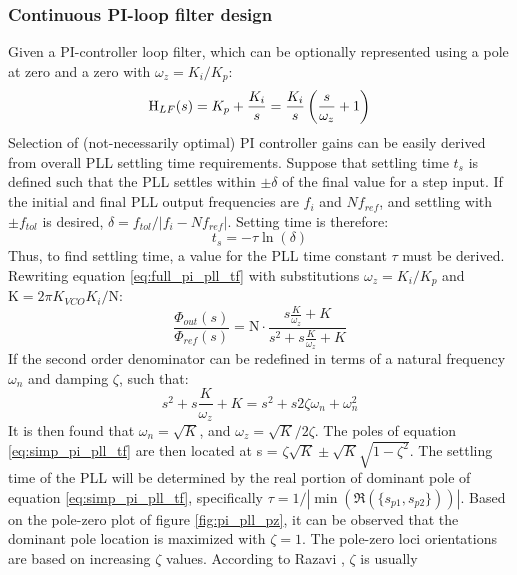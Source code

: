 		\subsubsection{Continuous PI-loop filter design}
			Given a PI-controller loop filter, which can be optionally represented using a pole at zero and a zero with $\omega_z = K_i/K_p$:
			\begin{equation} \label{eq:pi_pll_tf}
				\textnormal{H}_{LF}(s) = K_p + \frac{K_i}{s}  = \frac{K_i}{s}\left(\frac{s}{\omega_z} + 1\right) 
			\end{equation}
			Selection of (not-necessarily optimal) PI controller gains can be easily derived from overall PLL settling time requirements. Suppose that settling time $t_s$ is defined such that the PLL settles within $\pm \delta$ of the final value for a step input. If the initial and final PLL output frequencies are $f_i$ and $Nf_{ref}$, and settling with $\pm f_{tol}$ is desired,  $\delta = f_{tol}/|f_i - Nf_{ref}|$. Setting time is therefore:
			\begin{equation}
				t_s = -\tau\ln(\delta)
			\end{equation}
			Thus, to find settling time, a value for the PLL time constant $\tau$ must be derived. Rewriting equation \ref{eq:full_pi_pll_tf} with substitutions $\omega_z = K_i/K_p$ and $\mathrm{K} = 2\pi K_{VCO}K_i/\mathrm{N}$:
			\begin{equation} \label{eq:simp_pi_pll_tf}
				\frac{\Phi_{out}(s)}{\Phi_{ref}(s)} = \mathrm{N}\cdot\frac{s\frac{K}{\omega_z} + K }{s^2 + s\frac{K}{\omega_z} + K}
			\end{equation}
			If the second order denominator can be redefined in terms of a natural frequency $\omega_n$ and damping $\zeta$, such that:
			\begin{equation}
				s^2 + s\frac{K}{\omega_z} + K = s^2 + s2\zeta\omega_n + \omega_n^2
			\end{equation}
			It is then found that $\omega_n = \sqrt{K}$, and $\omega_z = \sqrt{K}/2\zeta$. The poles of equation \ref{eq:simp_pi_pll_tf} are then located at s = $\zeta\sqrt{K} \pm \sqrt{K}\sqrt{1-\zeta^2}$.
			The settling time of the PLL will be determined by the real portion of dominant pole of equation \ref{eq:simp_pi_pll_tf}, specifically $\tau = 1/|\min(\Re(\{s_{p1}, s_{p2}\}))|$. Based on the pole-zero plot of figure \ref{fig:pi_pll_pz}, it can be observed that the dominant pole location is maximized with $\zeta=1$. The pole-zero loci orientations are based on increasing $\zeta$ values. According to Razavi \cite{razavi_2017}, $\zeta$ is usually 
